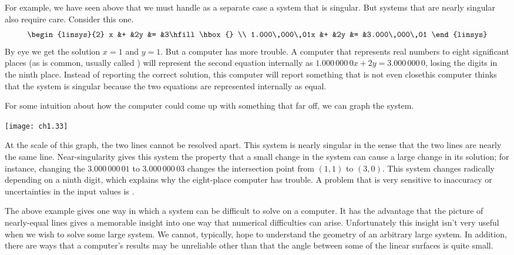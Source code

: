For example, we have seen above that we must handle as a separate case a
system that is singular.
But systems that are nearly singular also require care.
Consider this one.
\begin{equation*}
   \begin{linsys}{2}
                   x &+ &2y &= &3\hfill\hbox{}  \\
     1.000\,000\,01x &+ &2y &= &3.000\,000\,01
   \end{linsys}
\end{equation*}
By eye we get the solution $x=1$ and $y=1$.
But a computer has more trouble.
A computer that represents real numbers to eight significant places (as is
common, usually called 
) will represent the second
equation internally as $1.000\,000\,0x+2y=3.000\,000\,0$, losing the
digits in the ninth place.
Instead of reporting the correct solution, this computer will report something
that is not even close\Dash this computer thinks that the system is singular
because the two equations are represented internally as equal.

For some intuition about how the computer could come up with 
something that far
off, we can graph the system.
\begin{center}
  \texttt{[image: ch1.33]}
\end{center}
At the scale of this graph, the two lines cannot be resolved apart.
This system is nearly singular in the sense that
the two lines are nearly the same line.
Near-singularity gives this system the property that a small change in the
system can cause a large change in its solution; for instance, changing the 
$3.000\,000\,01$ to $3.000\,000\,03$ changes the intersection point
from $(1,1)$ to $(3,0)$.
This system changes radically depending on a ninth digit, which explains why
the eight-place computer has trouble.
A problem that is very sensitive to inaccuracy or uncertainties in
the input values is .

The above example gives one way in which a system can be
difficult to solve on a computer.
It has the advantage that the picture of nearly-equal lines gives a memorable 
insight into one way that numerical difficulties can arise.
Unfortunately this insight isn't very useful when we wish
to solve some large system.
We cannot, typically, hope to understand the geometry of an arbitrary large
system.
In addition, there are ways that a computer's results may be
unreliable other than that the angle between some
of the linear surfaces is quite small.

